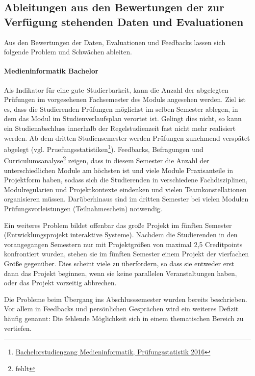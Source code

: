 \subsection{Ableitungen aus den Bewertungen der zur Verfügung
stehenden Daten und
Evaluationen}\label{ableitungen-aus-den-bewertungen-der-zur-verfuxfcgung-stehenden-daten-und-evaluationen}

Aus den Bewertungen der Daten, Evaluationen und Feedbacks lassen sich
folgende Problem und Schwächen ableiten.

\paragraph{Medieninformatik Bachelor}\label{medieninformatik-bachelor}

Als Indikator für eine gute Studierbarkeit, kann die Anzahl der
abgelegten Prüfungen im vorgesehenen Fachsemester des Moduls angesehen
werden. Ziel ist es, dass die Studierenden Prüfungen möglichst im selben
Semester ablegen, in dem das Modul im Studienverlaufsplan verortet ist.
Gelingt dies nicht, so kann ein Studienabschluss innerhalb der
Regelstudienzeit fast nicht mehr realisiert werden. Ab dem dritten
Studiensemester werden Prüfungen zunehmend verspätet abgelegt (vgl.
Pruefungsstatistiken\footnote{\href{../anhaenge/pruefungsstatistiken.pdf}{Bachelorstudiengang
  Medieninformatik, Prüfungsstatistik 2016}}). Feedbacks, Befragungen
und Curriculumsanalyse\footnote{fehlt} zeigen, dass in diesem Semester
die Anzahl der unterschiedlichen Module am höchsten ist und viele Module
Praxisanteile in Projektform haben, sodass sich die Studierenden in
verschiedene Fachdisziplinen, Modulregularien und Projektkontexte
eindenken und vielen Teamkonstellationen organisieren müssen.
Darüberhinaus sind im dritten Semester bei vielen Modulen
Prüfungsvorleistungen (Teilnahmeschein) notwendig.

Ein weiteres Problem bildet offenbar das große Projekt im fünften
Semester (Entwicklungsprojekt interaktive Systeme). Nachdem die
Studierenden in den vorangegangen Semestern nur mit Projektgrößen von
maximal 2,5 Creditpoints konfrontiert wurden, stehen sie im fünften
Semester einem Projekt der vierfachen Größe gegenüber. Dies scheint
viele zu überfordern, so dass sie entweder erst dann das Projekt
beginnen, wenn sie keine parallelen Veranstaltungen haben, oder das
Projekt vorzeitig abbrechen.

Die Probleme beim Übergang ins Abschlusssemester wurden bereits
beschrieben. Vor allem in Feedbacks und persönlichen Gesprächen wird ein
weiteres Defizit häufig genannt: Die fehlende Möglichkeit sich in einem
thematischen Bereich zu vertiefen.

